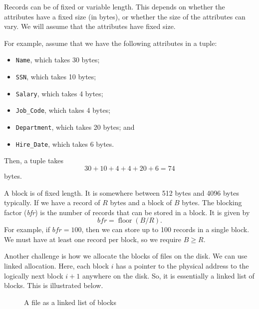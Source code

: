 \documentclass[a4paper, openany]{memoir}
\begin{document}
Records can be of fixed or variable length. This depends on whether the attributes have a fixed size (in bytes), or whether the size of the attributes can vary. We will assume that the attributes have fixed size. 

For example, assume that we have the following attributes in a tuple:
\begin{itemize}
    \item \texttt{Name}, which takes 30 bytes;
    \item \texttt{SSN}, which takes 10 bytes;
    \item \texttt{Salary}, which takes 4 bytes;
    \item \texttt{Job\_Code}, which takes 4 bytes;
    \item \texttt{Department}, which takes 20 bytes; and
    \item \texttt{Hire\_Date}, which takes 6 bytes.
\end{itemize}
Then, a tuple takes
\[30 + 10 + 4 + 4 + 20 + 6 = 74\]
bytes.

A block is of fixed length. It is somewhere between 512 bytes and 4096 bytes typically. If we have a record of $R$ bytes and a block of $B$ bytes. The blocking factor (\textit{bfr}) is the number of records that can be stored in a block. It is given by
\[\textit{bfr} = \operatorname{floor}(B/R).\]
For example, if $\textit{bfr} = 100$, then we can store up to 100 records in a single block. We must have at least one record per block, so we require $B \geq R$.

Another challenge is how we allocate the blocks of files on the disk. We can use linked allocation. Here, each block $i$ has a pointer to the physical address to the logically next block $i+1$ anywhere on the disk. So, it is essentially a linked list of blocks. This is illustrated below.
\begin{figure}[H]
    \centering
    \caption{A file as a linked list of blocks}
\end{figure}
\end{document}
